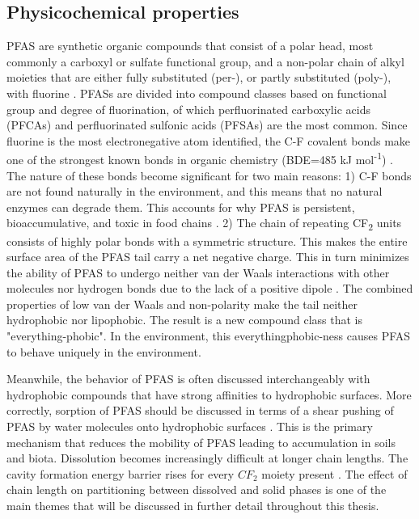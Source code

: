 \subsection{Physicochemical properties}\label{sec:physchem} 
PFAS are synthetic organic compounds that consist of a polar head, most commonly a carboxyl or sulfate functional group, and a non-polar chain of alkyl moieties that are either fully substituted (per-), or partly substituted (poly-), with fluorine \citep{wang2011physchem}. PFASs are divided into compound classes based on functional group and degree of fluorination, of which perfluorinated carboxylic acids (PFCAs) and perfluorinated sulfonic acids (PFSAs) are the most common. Since fluorine is the most electronegative atom identified, the C-F covalent bonds make one of the strongest known bonds in organic chemistry (BDE=485 kJ mol\textsuperscript{-1}) \citep{Lau2007}. The nature of these bonds become significant for two main reasons: 1) C-F bonds are not found naturally in the environment, and this means that no natural enzymes can degrade them. This accounts for why PFAS is persistent, bioaccumulative, and toxic in food chains \citep{hale2020persistent,krafft2015per}. 2) The chain of repeating CF\textsubscript{2} units consists of highly polar bonds with a symmetric structure. This makes the  entire surface area of the PFAS tail carry a net negative charge. This in turn minimizes the ability of PFAS to undergo neither van der Waals interactions with other molecules nor hydrogen bonds due to the lack of a positive dipole \citep{Arp2006}. The combined properties of low van der Waals and non-polarity make the tail neither hydrophobic nor lipophobic. The result is a new compound class that is "everything-phobic". In the environment, this everythingphobic-ness causes PFAS to behave uniquely in the environment. 

Meanwhile, the behavior of PFAS is often discussed interchangeably with hydrophobic compounds that have strong affinities to hydrophobic surfaces. More correctly, sorption of PFAS should be discussed in terms of a shear pushing of PFAS by water molecules onto hydrophobic surfaces \citep{Arp2006}. This is the primary mechanism that reduces the mobility of PFAS leading to accumulation in soils and biota. Dissolution becomes increasingly difficult at longer chain lengths. The cavity formation energy barrier rises for every $CF_2$ moiety present \citep{bhhatarai2011,Arp2006}. The effect of chain length on partitioning between dissolved and solid phases is one of the main themes that will be discussed in further detail throughout this thesis.

